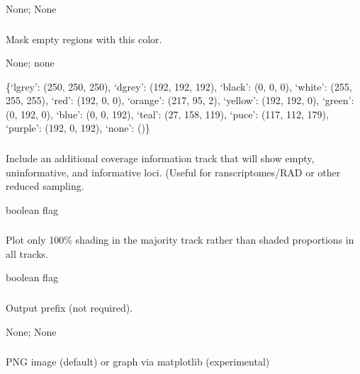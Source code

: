 \documentclass[letterpaper,11pt,english]{sphinxmanual}
\begin{document}
 None;  None


\subsubsection{}
\label{\detokenize{prog_desc:empty-mask-emptymask}}
 Mask empty regions with this color.

 None;  none

 \{‘lgrey’: (250, 250, 250), ‘dgrey’: (192, 192, 192), ‘black’: (0, 0, 0), ‘white’: (255, 255, 255), ‘red’: (192, 0, 0), ‘orange’: (217, 95, 2), ‘yellow’: (192, 192, 0), ‘green’: (0, 192, 0), ‘blue’: (0, 0, 192), ‘teal’: (27, 158, 119), ‘puce’: (117, 112, 179), ‘purple’: (192, 0, 192), ‘none’: ()\}


\subsubsection{}
\label{\detokenize{prog_desc:info-track-infotrack}}
 Include an additional coverage information track that will show empty, uninformative, and informative loci. (Useful for ranscriptomes/RAD or other reduced sampling.

 boolean flag


\subsubsection{}
\label{\detokenize{prog_desc:majority}}
 Plot only 100\% shading in the majority track  rather than shaded proportions in all tracks.

 boolean flag


\subsubsection{}
\label{\detokenize{prog_desc:outprefix}}
 Output prefix (not required).

 None;  None


\subsubsection{}
\label{\detokenize{prog_desc:plot-type-plottype}}
 PNG image (default) or graph via matplotlib (experimental)
\end{document}
